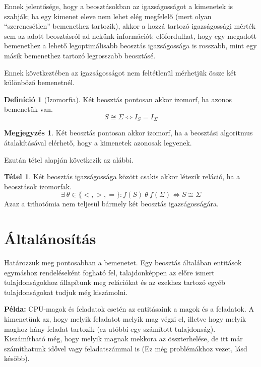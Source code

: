 \documentclass[twocolumn]{article}
\theoremstyle{definition}
\newtheorem{definition}{Definíció}[section]
\newtheorem{theorem}{Tétel}[section]
\newtheorem*{megj}{Megjegyzés}
\newcommand{\set}[1]{ \{ {#1} \} }
\newcommand{\pl}{ \textbf{Példa:} }
\begin{document}
    Ennek jelentősége, hogy a beosztásokban az igazságosságot a kimenetek is szabják; ha egy kimenet eleve nem lehet elég megfelelő (mert olyan \enquote{szerencsétlen} bemenethez tartozik), akkor a hozzá tartozó igazságossági mérték sem az adott beosztásról ad nekünk információt: előfordulhat, hogy egy megadott bemenethez a lehető legoptimálisabb beosztás igazságossága is rosszabb, mint egy másik bemenethez tartozó legrosszabb beosztásé.
    
    Ennek következtében az igazságosságot nem feltétlenül mérhetjük össze két különböző bemenetnél.
    
    \begin{definition}[Izomorfia]
        Két beosztás pontosan akkor izomorf, ha azonos bemenetük van.
        \begin{equation} S \cong \Sigma \Longleftrightarrow I_S = I_\Sigma \end{equation}
        \begin{megj}
            Két beosztás pontosan akkor izomorf, ha a beosztási algoritmus átalakításával elérhető, hogy a kimenetek azonosak legyenek.
        \end{megj}
    \end{definition}
    
    Ezután \az{\ref{thm:kulonbozoseg}} tétel alapján következik az alábbi.
    
    \begin{theorem}\label{thm:trihotomia}
        Két beosztás igazságossága között csakis akkor létezik reláció, ha a beosztások izomorfak.
        \begin{equation} \exists \ \theta \in \set{<, >, =}: f(S)\ \theta\ f(\Sigma) \Longleftrightarrow S \cong \Sigma \end{equation}
        Azaz a trihotómia nem teljesül bármely két beosztás igazságosságára.
    \end{theorem}
    
\section{Általánosítás}
    
    Határozzuk meg pontosabban a bemenetet. Egy beosztás általában entitások egymáshoz rendeléseként fogható fel, talajdonképpen az előre ismert tulajdonságokhoz állapítunk meg relációkat és az ezekhez tartozó egyéb tulajdonságokat tudjuk még kiszámolni.
    
    \pl CPU-magok és feladatok esetén az entitásaink a magok és a feladatok. A kimenetünk az, hogy melyik feladatot melyik mag végzi el, illetve hogy melyik maghoz hány feladat tartozik (ez utóbbi egy számított tulajdonság). Kiszámítható még, hogy melyik magnak mekkora az összterhelése, de itt már számíthatunk idővel vagy feladatszámmal is (Ez még problémákhoz vezet, lásd később).
    
\end{document}
